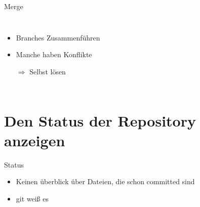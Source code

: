 \documentclass{beamer}
\begin{document}
    \begin{frame}{Merge}
      \begin{columns}
          \begin{itemize}[<+->]
            \item Branches Zusammenführen
            \item Manche haben Konflikte
            \item[$\Rightarrow$] Selbst lösen
          \end{itemize}
      \end{columns}
    \end{frame}

  \section[Status]{Den Status der Repository anzeigen}

    \begin{frame}{Status}
          \begin{itemize}[<+->]
            \item Keinen überblick über Dateien, die schon committed sind
            \item git weiß es
          \end{itemize}
    \end{frame}
\end{document}
